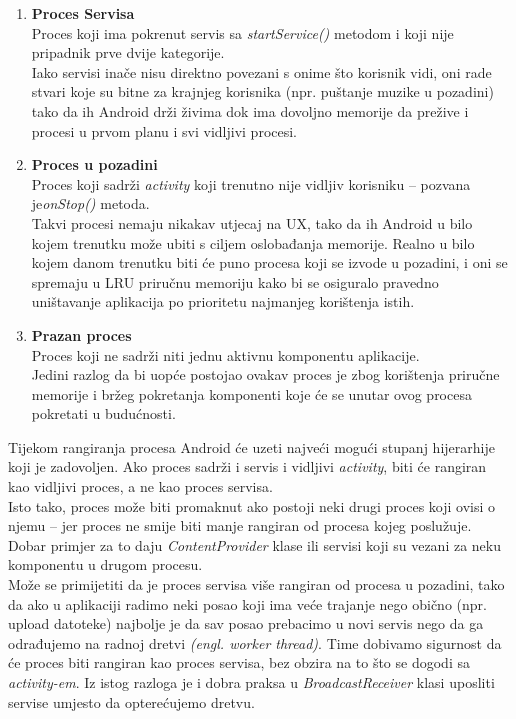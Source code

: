 \documentclass[times, utf8, zavrsni]{fer}
\begin{document}
\begin{enumerate}
\item
\textbf{Proces Servisa}\\
Proces koji ima pokrenut servis sa \textit{startService()} metodom i koji nije pripadnik prve dvije kategorije.\\
Iako servisi inače nisu direktno povezani s onime što korisnik vidi, oni rade stvari koje su bitne za krajnjeg korisnika (npr. puštanje muzike u pozadini) tako da ih Android drži živima dok ima dovoljno memorije da prežive i procesi u prvom planu i svi vidljivi procesi.

\item
\textbf{Proces u pozadini}\\
Proces koji sadrži \textit{activity} koji trenutno nije vidljiv korisniku – pozvana je\linebreak \textit{onStop()} metoda.\\
Takvi procesi nemaju nikakav utjecaj na UX, tako da ih Android u bilo kojem trenutku može ubiti s ciljem oslobađanja memorije. Realno u bilo kojem danom trenutku biti će puno procesa koji se izvode u pozadini, i oni se spremaju u LRU priručnu memoriju kako bi se osiguralo pravedno uništavanje aplikacija po prioritetu najmanjeg korištenja istih.

\pagebreak
\item
\textbf{Prazan proces}\\
Proces koji ne sadrži niti jednu aktivnu komponentu aplikacije.\\
Jedini razlog da bi uopće postojao ovakav proces je zbog korištenja priručne memorije i bržeg pokretanja komponenti koje će se unutar ovog procesa pokretati u budućnosti.

\end{enumerate}

Tijekom rangiranja procesa Android će uzeti najveći mogući stupanj hijerarhije koji je zadovoljen. Ako proces sadrži i servis i vidljivi \textit{activity}, biti će rangiran kao vidljivi proces, a ne kao proces servisa.\\

Isto tako, proces može biti promaknut ako postoji neki drugi proces koji ovisi o njemu – jer proces ne smije biti manje rangiran od procesa kojeg poslužuje. Dobar primjer za to daju \textit{ContentProvider} klase ili servisi koji su vezani za neku komponentu u drugom procesu.\\

Može se primijetiti da je proces servisa više rangiran od procesa u pozadini, tako da ako u aplikaciji radimo neki posao koji ima veće trajanje nego obično (npr. upload datoteke) najbolje je da sav posao prebacimo u novi servis nego da ga odrađujemo na radnoj dretvi \textit{(engl. worker thread)}. Time dobivamo sigurnost da će proces biti rangiran kao proces servisa, bez obzira na to što se dogodi sa \textit{activity-em}. Iz istog razloga je i dobra praksa u \textit{BroadcastReceiver} klasi uposliti servise umjesto da opterećujemo dretvu.
\end{document}
